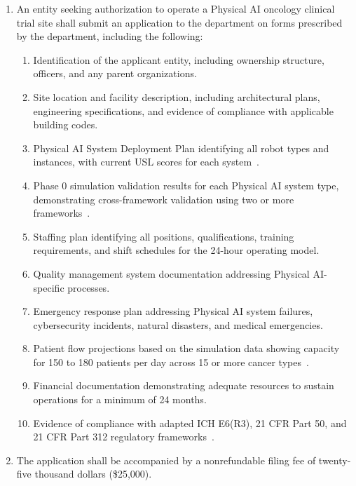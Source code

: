 \begin{enumerate}[label=(\alph*)]
\item An entity seeking authorization to operate a Physical AI oncology
  clinical trial site shall submit an application to the department on forms
  prescribed by the department, including the following:
  \begin{enumerate}[label=(\arabic*)]
  \item Identification of the applicant entity, including ownership structure,
    officers, and any parent organizations.
  \item Site location and facility description, including architectural plans,
    engineering specifications, and evidence of compliance with applicable
    building codes.
  \item Physical AI System Deployment Plan identifying all robot types and
    instances, with current USL scores for each system~\cite{usl2026}.
  \item Phase 0 simulation validation results for each Physical AI system
    type, demonstrating cross-framework validation using two or more
    frameworks~\cite{iche6r3adapt}.
  \item Staffing plan identifying all positions, qualifications, training
    requirements, and shift schedules for the 24-hour operating model.
  \item Quality management system documentation addressing Physical AI-specific
    processes.
  \item Emergency response plan addressing Physical AI system failures,
    cybersecurity incidents, natural disasters, and medical emergencies.
  \item Patient flow projections based on the simulation data showing capacity
    for 150 to 180 patients per day across 15 or more cancer
    types~\cite{newtrial2026}.
  \item Financial documentation demonstrating adequate resources to sustain
    operations for a minimum of 24 months.
  \item Evidence of compliance with adapted ICH E6(R3), 21 CFR Part 50, and
    21 CFR Part 312 regulatory frameworks~\cite{iche6r3adapt,cfr50adapt,cfr312adapt}.
  \end{enumerate}

\item The application shall be accompanied by a nonrefundable filing fee of
  twenty-five thousand dollars (\$25,000).
\end{enumerate}

